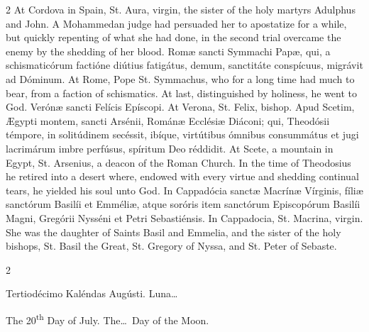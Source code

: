 \begin{paracol}{2}
At Cordova in Spain, St. Aura, 
 virgin, the sister of the holy martyrs Adulphus and John. A Mohammedan 
 judge had persuaded her to apostatize for a while, but quickly repenting of 
 what she had done, in the second trial overcame the enemy by the shedding of 
 her blood.
\switchcolumn*
{}
Romæ sancti Symmachi 
 Papæ, qui, a schismaticórum factióne diútius fatigátus, demum, sanctitáte 
 conspícuus, migrávit ad Dóminum.
\switchcolumn
{}
At Rome, Pope St. Symmachus, who for 
 a long time had much to bear, from a faction of schismatics. At last, 
 distinguished by holiness, he went to God.
\switchcolumn*
{}
Verónæ sancti Felícis 
 Epíscopi.
\switchcolumn
{}
At Verona, St. Felix, bishop.
\switchcolumn*
{}
Apud Scetim, Ægypti 
 montem, sancti Arsénii, Románæ Ecclésiæ Diáconi; qui, Theodósii témpore, in 
 solitúdinem secéssit, ibíque, virtútibus ómnibus consummátus et jugi 
 lacrimárum imbre perfúsus, spíritum Deo réddidit.
\switchcolumn
{}
At Scete, a mountain in Egypt, St. 
 Arsenius, a deacon of the Roman Church. In the time of Theodosius he 
 retired into a desert where, endowed with every virtue and shedding 
 continual tears, he yielded his soul unto God.
\switchcolumn*
{}
In Cappadócia sanctæ 
 Macrínæ Vírginis, fíliæ sanctórum Basilíi et Emméliæ, atque soróris item 
 sanctórum Episcopórum Basilíi Magni, Gregórii Nysséni et Petri Sebastiénsis.
\switchcolumn
{}
In Cappadocia, St. Macrina, virgin. 
 She was the daughter of Saints Basil and Emmelia, and the sister of the holy 
 bishops, St. Basil the Great, St. Gregory of Nyssa, and St. Peter of Sebaste.
\switchcolumn*
{}
\end{paracol}


\begin{paracol}{2}
\begin{center}{\color{gregoriocolor} Tertiodécimo Kaléndas Augústi. 
 Luna\dots\ }\end{center}
\switchcolumn
{}
\begin{center}{\color{gregoriocolor} The 
 20\textsuperscript{th} Day of 
 July. The\dots\ Day of the Moon.}\end{center}
\end{paracol}

